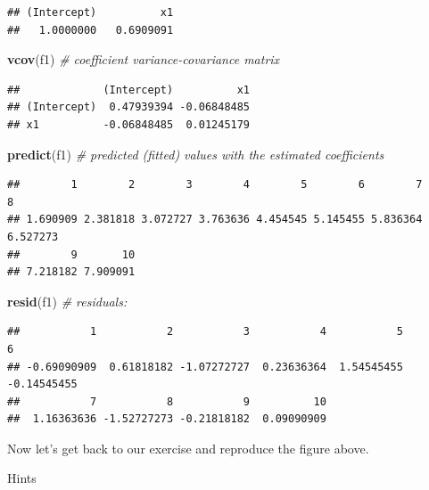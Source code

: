 \documentclass[]{book}
\newenvironment{Shaded}{\begin{snugshade}}{\end{snugshade}}
\newcommand{\KeywordTok}[1]{\textcolor[rgb]{0.13,0.29,0.53}{\textbf{{#1}}}}
\newcommand{\CommentTok}[1]{\textcolor[rgb]{0.56,0.35,0.01}{\textit{{#1}}}}
\newcommand{\NormalTok}[1]{{#1}}
\theoremstyle{definition}
\theoremstyle{definition}
\theoremstyle{remark}
\begin{document}
\begin{verbatim}
## (Intercept)          x1 
##   1.0000000   0.6909091
\end{verbatim}

\begin{Shaded}
\begin{Highlighting}[]
\KeywordTok{vcov}\NormalTok{(f1)          }\CommentTok{# coefficient variance-covariance matrix}
\end{Highlighting}
\end{Shaded}

\begin{verbatim}
##             (Intercept)          x1
## (Intercept)  0.47939394 -0.06848485
## x1          -0.06848485  0.01245179
\end{verbatim}

\begin{Shaded}
\begin{Highlighting}[]
\KeywordTok{predict}\NormalTok{(f1)       }\CommentTok{# predicted (fitted) values with the estimated coefficients }
\end{Highlighting}
\end{Shaded}

\begin{verbatim}
##        1        2        3        4        5        6        7        8 
## 1.690909 2.381818 3.072727 3.763636 4.454545 5.145455 5.836364 6.527273 
##        9       10 
## 7.218182 7.909091
\end{verbatim}

\begin{Shaded}
\begin{Highlighting}[]
\KeywordTok{resid}\NormalTok{(f1)         }\CommentTok{# residuals:  }
\end{Highlighting}
\end{Shaded}

\begin{verbatim}
##           1           2           3           4           5           6 
## -0.69090909  0.61818182 -1.07272727  0.23636364  1.54545455 -0.14545455 
##           7           8           9          10 
##  1.16363636 -1.52727273 -0.21818182  0.09090909
\end{verbatim}

Now let's get back to our exercise and reproduce the figure above.

Hints
\end{document}
